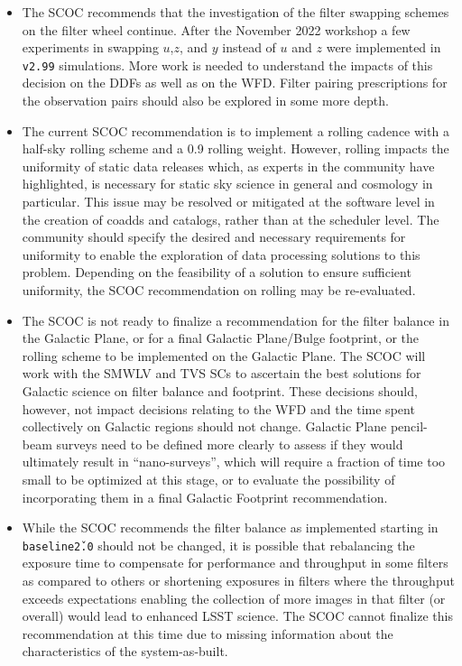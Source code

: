 \documentclass[PST,authoryear,toc]{lsstdoc}
\begin{document}
\begin{itemize}

\item The SCOC recommends that the investigation of the filter swapping schemes on the filter wheel continue. After the November 2022 workshop a few experiments in swapping $u$,$z$, and $y$ instead of $u$ and $z$ were implemented in \texttt{v2.99} simulations. More work is needed to understand the impacts of this decision on the DDFs as well as on the WFD. Filter pairing prescriptions for the observation pairs should also be explored in some more depth.

\item The current SCOC recommendation is to implement a rolling cadence with a half-sky rolling scheme and a 0.9 rolling weight. However, rolling impacts the uniformity of static data releases which, as experts in the community have highlighted, is necessary for static sky science in general and cosmology in particular. This issue may be resolved or mitigated at the software level in the creation of coadds and catalogs, rather than at the scheduler level. The community should specify the desired and necessary requirements for uniformity to enable the exploration of data processing solutions to this problem. Depending on the feasibility of a solution to ensure sufficient uniformity, the SCOC recommendation on rolling may be re-evaluated. 

\item The SCOC is not ready to finalize a recommendation for the
filter balance in the Galactic Plane, or for a final Galactic Plane/Bulge footprint, or the rolling scheme to be implemented on the Galactic Plane. The SCOC will work with the SMWLV and TVS SCs to ascertain the best solutions for Galactic science on filter balance and footprint. These decisions should, however, not impact decisions relating to the WFD and the time spent collectively on Galactic regions should not change.
Galactic Plane pencil-beam surveys need to be defined more clearly to assess if they would ultimately result in ``nano-surveys'', which will require a fraction of time too small to be optimized at this stage, or to evaluate the possibility of incorporating them in a final Galactic Footprint recommendation.

\item While the SCOC recommends the filter balance as implemented starting in \texttt{baseline\v2.0} should not be changed, it is possible that rebalancing the
exposure time to compensate for performance and throughput in some filters as compared to others or shortening exposures in filters where the throughput exceeds expectations enabling the collection of more images in that filter (or overall) would lead to
enhanced LSST science. The SCOC cannot finalize this recommendation at this time due to
missing information about the characteristics of the system-as-built.




\end{itemize}
\end{document}
